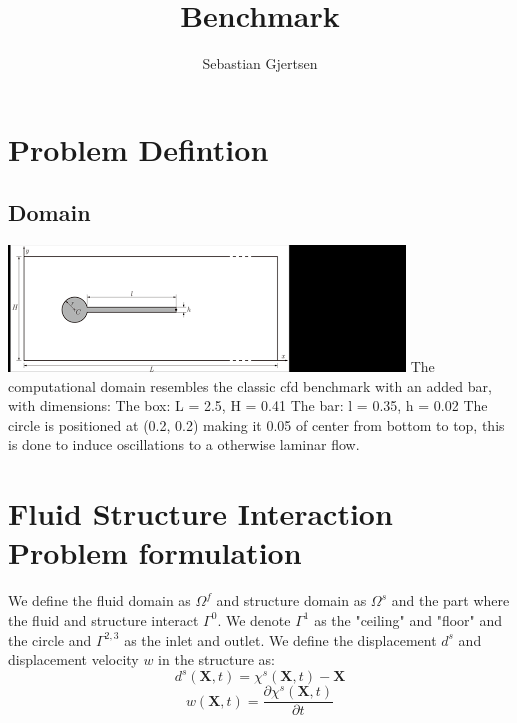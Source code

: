 
\usepackage{amsmath}                                    
\title{Benchmark}
\author{Sebastian Gjertsen}

\maketitle
\section*{Problem Defintion}
\subsection*{Domain}
\includegraphics[scale=0.9]{geometry.png}
The computational domain resembles the classic cfd benchmark with an added bar, with dimensions:
The box: L = 2.5, H = 0.41
The bar: l = 0.35, h = 0.02
The circle is positioned at (0.2, 0.2) making it 0.05 of center from bottom to top, this is done to induce oscillations to a otherwise laminar flow.

\section*{Fluid Structure Interaction Problem formulation}
We define the fluid domain as $\Omega^f$ and structure domain as $\Omega^s$ and the part where the fluid and structure interact $\Gamma^0$. We denote $\Gamma^1$ as the "ceiling" and "floor" and the circle and $\Gamma^{2,3}$ as the inlet and outlet.
We define the displacement $d^s$ and displacement velocity $w$ in the structure as:
$$  d^s(\textbf{X},t) = \chi^s(\textbf{X},t) -\textbf{X}   $$
$$  w(\textbf{X},t) = \frac{\partial \chi^s(\textbf{X},t)}{\partial t}   $$

